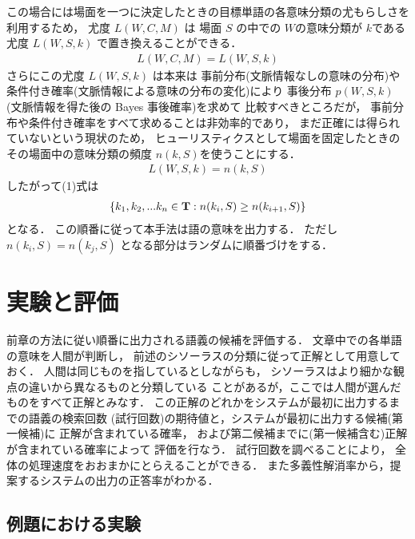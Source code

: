 この場合には場面を一つに決定したときの目標単語の各意味分類の尤もらしさを
利用するため，
尤度 \hspace{-0.5mm}\(L(W,C,M)\)\hspace{-0.5mm} は 場面 \(S\) の中での \(W\)の意味分類が \(k\)である尤度
\(L(W,S,k)\) で置き換えることができる．
\begin{eqnarray}
  L(W,C,M) = L(W,S,k)
\end{eqnarray}
さらにこの尤度 \(L(W,S,k)\) は本来は
事前分布(文脈情報なしの意味の分布)や
条件付き確率(文脈情報による意味の分布の変化)により
事後分布 \(p(W,S,k)\) (文脈情報を得た後の Bayes 事後確率)を求めて
比較すべきところだが，
事前分布や条件付き確率をすべて求めることは非効率的であり，
まだ正確には得られていないという現状のため，
ヒューリスティクスとして場面を固定したときのその場面中の意味分類の頻度
\(n(k,S)\)を使うことにする．
\vspace{-0.5mm}
\begin{eqnarray}
 L(W,S,k) = n(k,S)
\end{eqnarray}
\vspace{-0.5mm}
したがって(1)式は
\vspace{-0.5mm}
\begin{eqnarray}
  \{k_{1},k_{2}, ... k_{n} \in {\bf T}: n(k_{i},S) \geq n(k_{i+1},S)\}
\end{eqnarray}
\vspace{-0.5mm}
となる．
この順番に従って本手法は語の意味を出力する．
ただし \(n(k_{i},S) = n(k_{j},S)\) となる部分はランダムに順番づけをする．

\section{実験と評価}

前章の方法に従い順番に出力される語義の候補を評価する．
文章中での各単語の意味を人間が判断し，
前述のシソーラスの分類に従って正解として用意しておく．
人間は同じものを指しているとしながらも，
シソーラスはより細かな観点の違いから異なるものと分類している
ことがあるが，ここでは人間が選んだものをすべて正解とみなす．
この正解のどれかをシステムが最初に出力するまでの語義の検索回数
(試行回数)の期待値と，システムが最初に出力する候補(第一候補)に
正解が含まれている確率，
および第二候補までに(第一候補含む)正解が含まれている確率によって
評価を行なう．
試行回数を調べることにより，
全体の処理速度をおおまかにとらえることができる．
また多義性解消率から，提案するシステムの出力の正答率がわかる．

\subsection{例題における実験}

